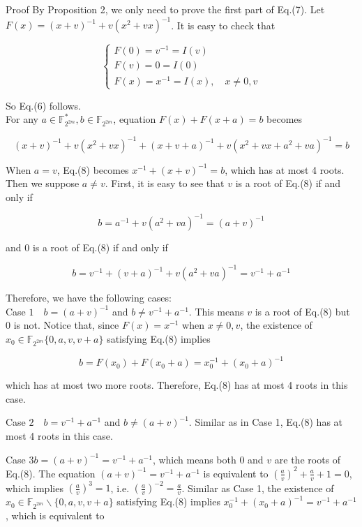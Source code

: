 \documentclass[10pt]{article}
\begin{document}
Proof By Proposition 2, we only need to prove the first part of Eq.(7). Let $F(x)=(x+v)^{-1}+v\left(x^{2}+v x\right)^{-1}$. It is easy to check that

$$
\left\{\begin{array}{l}
F(0)=v^{-1}=I(v) \\
F(v)=0=I(0) \\
F(x)=x^{-1}=I(x), \quad x \neq 0, v
\end{array}\right.
$$

So Eq.(6) follows.\\
For any $a \in \mathbb{F}_{2^{2 m}}^{*}, b \in \mathbb{F}_{2^{2 m}}$, equation $F(x)+F(x+a)=b$ becomes


\begin{equation*}
(x+v)^{-1}+v\left(x^{2}+v x\right)^{-1}+(x+v+a)^{-1}+v\left(x^{2}+v x+a^{2}+v a\right)^{-1}=b \tag{8}
\end{equation*}


When $a=v$, Eq.(8) becomes $x^{-1}+(x+v)^{-1}=b$, which has at most 4 roots. Then we suppose $a \neq v$. First, it is easy to see that $v$ is a root of Eq.(8) if and only if

$$
b=a^{-1}+v\left(a^{2}+v a\right)^{-1}=(a+v)^{-1}
$$

and 0 is a root of Eq.(8) if and only if

$$
b=v^{-1}+(v+a)^{-1}+v\left(a^{2}+v a\right)^{-1}=v^{-1}+a^{-1}
$$

Therefore, we have the following cases:\\
Case $1 \quad b=(a+v)^{-1}$ and $b \neq v^{-1}+a^{-1}$. This means $v$ is a root of Eq.(8) but 0 is not. Notice that, since $F(x)=x^{-1}$ when $x \neq 0, v$, the existence of $x_{0} \in \mathbb{F}_{2^{2 m}}\{0, a, v, v+a\}$ satisfying Eq.(8) implies

$$
b=F\left(x_{0}\right)+F\left(x_{0}+a\right)=x_{0}^{-1}+\left(x_{0}+a\right)^{-1}
$$

which has at most two more roots. Therefore, Eq.(8) has at most 4 roots in this case.

Case $2 \quad b=v^{-1}+a^{-1}$ and $b \neq(a+v)^{-1}$. Similar as in Case 1, Eq.(8) has at most 4 roots in this case.

Case $3 b=(a+v)^{-1}=v^{-1}+a^{-1}$, which means both 0 and $v$ are the roots of Eq.(8). The equation $(a+v)^{-1}= v^{-1}+a^{-1}$ is equivalent to $\left(\frac{a}{v}\right)^{2}+\frac{a}{v}+1=0$, which implies $\left(\frac{a}{v}\right)^{3}=1$, i.e. $\left(\frac{a}{v}\right)^{-2}=\frac{a}{v}$. Similar as Case 1, the existence of $x_{0} \in \mathbb{F}_{2^{2 m}} \backslash\{0, a, v, v+a\}$ satisfying Eq.(8) implies $x_{0}^{-1}+\left(x_{0}+a\right)^{-1}=v^{-1}+a^{-1}$, which is equivalent to
\end{document}
